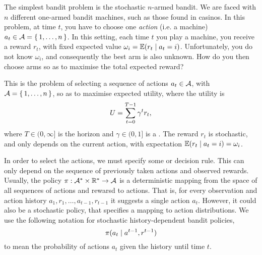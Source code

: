 The simplest bandit problem is the stochastic $n$-armed bandit. We are faced with $n$ different one-armed bandit machines, such as those found in casinos. In this problem, at time $t$, you have to choose one \emph{action} (i.e. a machine) $a_t \in {\mathcal{A}} = \left\{\, 1, \ldots, n \,\right\}$. In this setting, each time $t$ you play a machine, you receive a reward $r_t$, with fixed expected value $\omega_i = \mathop{\mbox{\ensuremath{\mathbb{E}}}}\nolimits (r_t \mid a_t = i)$.
Unfortunately, you do not know $\omega_i$, and consequently the best arm is also unknown. How do you then choose arms so as to maximise the total expected reward? 
\begin{definition}
  This is the problem of selecting a sequence of actions $a_t \in {\mathcal{A}}$, with ${\mathcal{A}} = \left\{\, 1, \ldots, n \,\right\}$, so as to maximise expected utility, where the utility is 
  \[
  U = \sum_{t=0}^{T - 1} \gamma^t r_t,
  \]
  where $T \in (0, \infty]$ is the horizon and $\gamma \in (0,1]$
  is a . The reward $r_t$ is stochastic,
  and only depends on the current action, with expectation $\mathop{\mbox{\ensuremath{\mathbb{E}}}}\nolimits(r_t
  \mid a_t = i) = \omega_i$.
\end{definition}
In order to select the actions, we must specify some  or decision rule. This can only depend on the sequence of previously taken actions and observed rewards. Usually, the policy $\pi :  {\mathcal{A}}^* \times {\mathbb{R}}^* \to {\mathcal{A}}$ is a deterministic mapping from the space of all sequences of actions and rewarsd to actions. That is, for every observation and action history $a_1, r_1, \ldots, a_{t-1}, r_{t-1}$ it suggests a single action $a_t$. However, it could also be a stochastic policy, that specifies a mapping to action distributions. We use the following notation for stochastic history-dependent bandit policies,
\begin{equation}
  \label{eq:history-dependent-bandit}
  \pi(a_t \mid a^{t-1}, r^{t-1})
\end{equation}
to mean the probability of actions $a_t$ given the history until time $t$.

